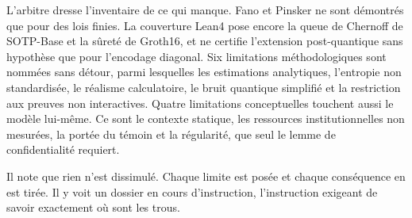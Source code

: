 \begin{boiteArbitre}
L'arbitre dresse l'inventaire de ce qui manque. Fano et Pinsker ne sont d\'emontr\'es que pour des lois finies. La couverture Lean4 pose encore la queue de Chernoff de SOTP-Base et la s\^uret\'e de Groth16,
et ne certifie l'extension post-quantique sans hypoth\`ese que pour l'encodage diagonal. Six limitations m\'ethodologiques sont
nomm\'ees sans d\'etour, parmi lesquelles les estimations analytiques, l'entropie non
standardis\'ee, le r\'ealisme calculatoire, le bruit quantique simplifi\'e
et la restriction aux preuves non interactives. Quatre limitations conceptuelles touchent
aussi le mod\`ele lui-m\^eme. Ce sont le contexte statique, les ressources institutionnelles non mesur\'ees, la port\'ee du t\'emoin
et la r\'egularit\'e, que seul le lemme de confidentialit\'e requiert.

Il note que rien n'est dissimul\'e. Chaque limite est pos\'ee et chaque
cons\'equence en est tir\'ee. Il y voit un dossier en cours d'instruction,
l'instruction exigeant de savoir exactement
o\`u sont les trous.
\end{boiteArbitre}

